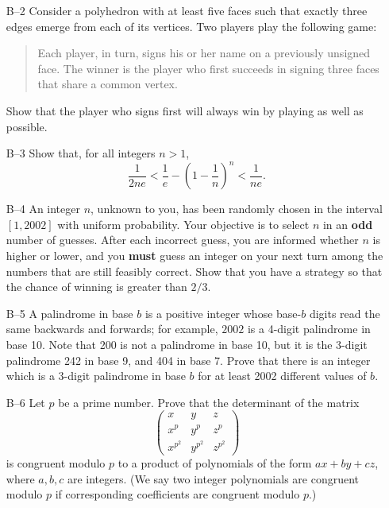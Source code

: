 \documentclass[amssymb,twocolumn,pra,10pt,aps]{revtex4-1}
\begin{document}
\begin{itemize}
\item[B--2]
Consider a polyhedron with at least five faces such that exactly three
edges emerge from each of its vertices. Two players play the following
game:
\begin{verse}
\noindent
Each player, in turn, signs his or her name on a previously
unsigned face. The winner is the player who first succeeds in
signing three faces that share a common vertex.
\end{verse}
Show that the player who signs first will always win by playing
as well as possible.

\item[B--3]
Show that, for all integers $n > 1$,
\[
\frac{1}{2ne} < \frac{1}{e} - \left( 1 - \frac{1}{n} \right)^n
< \frac{1}{ne}.
\]

\item[B--4]
An integer $n$, unknown to you, has been randomly chosen in the
interval $[1, 2002]$ with uniform probability. Your objective is
to select $n$ in an \textbf{odd} number of guesses. After
each incorrect guess, you are informed whether $n$ is higher
or lower, and you \textbf{must} guess an integer on your next turn
among the numbers that are still feasibly correct. Show that you
have a strategy so that the chance of winning is greater than $2/3$.

\item[B--5]
A palindrome in base $b$ is a positive integer whose base-$b$
digits read the same backwards and forwards; for example,
$2002$ is a 4-digit palindrome in base 10. Note that 200 is not
a palindrome in base 10, but it is the 3-digit palindrome
242 in base 9, and 404 in base 7. Prove that there is an integer
which is a 3-digit palindrome in base $b$ for at least 2002
different values of $b$.

\item[B--6]
Let $p$ be a prime number. Prove that the determinant of the matrix
\[
\begin{pmatrix}
x & y & z \\
x^p & y^p & z^p \\
x^{p^2} & y^{p^2} & z^{p^2}
\end{pmatrix}
\]
is congruent modulo $p$ to a product of polynomials of the form
$ax+by+cz$, where $a,b,c$ are integers. (We say two integer
polynomials are congruent modulo $p$ if corresponding coefficients
are congruent modulo $p$.)

\end{itemize}
\end{document}
